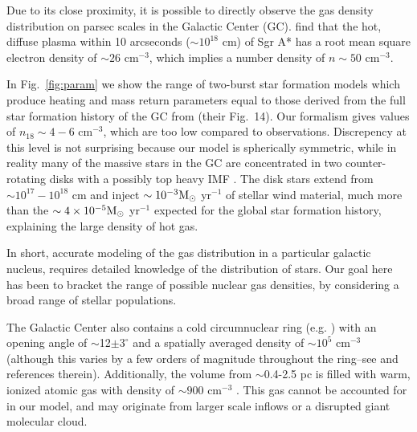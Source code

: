 \documentclass[usenatbib,fleqn]{mnras}
\newcommand{\Msun}{{\rm M_\odot}}
\begin{document}
Due to its close proximity, it is possible to directly observe the gas
density distribution on parsec scales in the Galactic Center
(GC). \citet{Baganoff+2003} find that the hot, diffuse plasma within
10 arcseconds ($\sim 10^{18}$ cm) of Sgr A* has a root mean square
electron density of $\sim 26$ cm$^{-3}$, which implies a number
density of $n\sim 50$ cm$^{-3}$. 


In Fig.~\ref{fig:param} we show the range of two-burst star formation
models which produce heating and mass return parameters equal to those
derived from the full star formation history of the GC from
\citet{Pfuhl+2011} (their Fig.~14).  Our formalism gives values of
$n_{18}\sim 4-6$ cm$^{-3}$, which are too low compared to
observations.  Discrepency at this level is not surprising because our
model is spherically symmetric, while in reality many of the massive
stars in the GC are concentrated in two counter-rotating disks
\citep{Genzel+2003} with a possibly top heavy IMF \citep{Bartko+2010}.  The
disk stars extend from $\sim 10^{17}-10^{18}$ cm and inject $\sim
10^{-3} \Msun$ yr$^{-1}$ of stellar wind material, much more than the
$\sim 4 \times 10^{-5} \Msun$ yr$^{-1}$ expected for the global star
formation history, explaining the large density of hot gas.

In short, accurate modeling of the gas distribution in a particular
galactic nucleus, requires detailed knowledge of the distribution of
stars. Our goal here has been to bracket the range of possible nuclear gas
densities, by considering a broad range of stellar populations.

The Galactic Center also contains a cold circumnuclear ring
(e.g. \citealt{Becklin+1982}) with an opening angle of
$\sim$12$\pm3^{\circ}$ \citep{Lau+2013} and a spatially averaged
density of $\sim 10^{5}$ cm$^{-3}$ (although this varies by a few
orders of magnitude throughout the ring--see \citealt{Ferriere2012} and
references therein). Additionally, the volume from $\sim$0.4-2.5 pc
is filled with warm, ionized atomic gas with density of $\sim 900$
cm$^{-3}$ \citep{Ferriere2012}. This gas cannot be accounted for in
our model, and may originate from larger scale inflows or a disrupted
giant molecular cloud.
\end{document}
